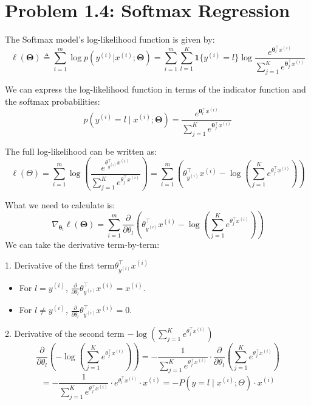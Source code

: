 \documentclass[12pt]{article}
\begin{document}
\section*{Problem 1.4: Softmax Regression}

The Softmax model's log-likelihood function is given by:
\[
\ell(\boldsymbol\Theta) \triangleq \sum_{i=1}^m \log p(y^{(i)} | x^{(i)}; \boldsymbol\Theta) = \sum_{i=1}^m \sum_{l=1}^K \mathbf{1}\{ y^{(i)} = l \} \log \frac{e^{\boldsymbol\theta_l^\top x^{(i)}}}{\sum_{j=1}^K e^{\boldsymbol\theta_j^\top x^{(i)}}}
\]

We can express the log-likelihood function in terms of the indicator function and the softmax probabilities:
\[
    p(y^{(i)} = l \mid x^{(i)}; \boldsymbol\Theta) = \frac{e^{\boldsymbol\theta_l^\top x^{(i)}}}{\sum_{j=1}^K e^{\boldsymbol\theta_j^\top x^{(i)}}}
\]

The full log-likelihood can be written as:
\[
\ell(\Theta) = \sum_{i=1}^m \log \left( \frac{e^{\theta_{y^{(i)}}^\top x^{(i)}}}{\sum_{j=1}^K e^{\theta_j^\top x^{(i)}}} \right)= \sum_{i=1}^m \left( \theta_{y^{(i)}}^\top x^{(i)} - \log \left( \sum_{j=1}^K e^{\theta_j^\top x^{(i)}} \right) \right)
\]

What we need to calculate is:
\[
    \nabla_{\boldsymbol\theta_l}\ell(\boldsymbol{\Theta}) =  \sum_{i=1}^m \frac{\partial}{\partial \theta_l} \left( \theta_{y^{(i)}}^\top x^{(i)} - \log \left( \sum_{j=1}^K e^{\theta_j^\top x^{(i)}} \right) \right)
\]
We can take the derivative term-by-term:

1. Derivative of the first term\( \theta_{y^{(i)}}^\top x^{(i)} \)

\begin{itemize}
    \item For \( l = y^{(i)} \), \( \frac{\partial}{\partial \theta_l} \theta_{y^{(i)}}^\top x^{(i)} = x^{(i)} \).
    \item For \( l \neq y^{(i)} \), \( \frac{\partial}{\partial \theta_l} \theta_{y^{(i)}}^\top x^{(i)} = 0 \).
\end{itemize}

2. Derivative of the second term \( - \log \left( \sum_{j=1}^K e^{\theta_j^\top x^{(i)}} \right) \)
\[
    \frac{\partial}{\partial \theta_l} \left( - \log \left( \sum_{j=1}^K e^{\theta_j^\top x^{(i)}} \right) \right) = - \frac{1}{\sum_{j=1}^K e^{\theta_j^\top x^{(i)}}} \cdot \frac{\partial}{\partial \theta_l} \left( \sum_{j=1}^K e^{\theta_j^\top x^{(i)}} \right)
\]
\[
    = - \frac{1}{\sum_{j=1}^K e^{\theta_j^\top x^{(i)}}} \cdot  e^{\theta_l^\top x^{(i)}} \cdot x^{(i)} = - P(y = l \mid x^{(i)}; \Theta) \cdot x^{(i)}
\]
\end{document}
